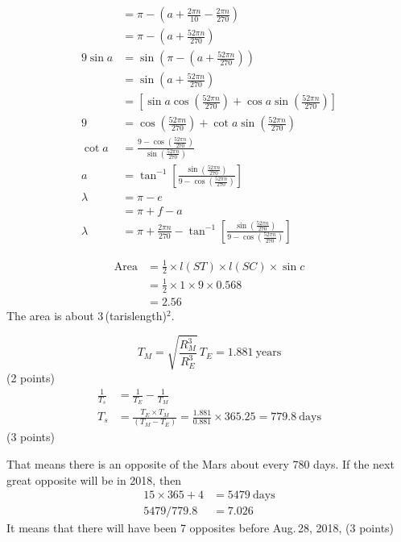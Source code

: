 \begin{description}
\begin{align*}
    &= \pi - \left(a + \frac{2\pi n}{10} - \frac{2\pi n}{270}\right) \tag{19}\\
    &= \pi - \left(a + \frac{52\pi n}{270}\right) \tag{20}\\[6pt]
  9\sin a &= \sin\left(\pi - \left(a + \frac{52\pi n}{270}\right)\right)
    \tag{21}\\
    &= \sin\left(a + \frac{52\pi n}{270}\right) \tag{22}\\
    &= \left[\sin a\cos\left(\frac{52\pi n}{270}\right)
       + \cos a\sin\left(\frac{52\pi n}{270}\right)\right] \tag{23}\\
  9 &= \cos\left(\frac{52\pi n}{270}\right)
       + \cot a\sin\left(\frac{52\pi n}{270}\right) \tag{24}\\
  \cot a &= \frac{9 - \cos\left(\frac{52\pi n}{270}\right)}
                 {\sin\left(\frac{52\pi n}{270}\right)} \tag{25}\\
  a &= \tan^{-1}\!\left[\frac{\sin\left(\frac{52\pi n}{270}\right)}
       {9 - \cos\left(\frac{52\pi n}{270}\right)}\right] \tag{26}\\[6pt]
  \lambda &= \pi - e \tag{27}\\
          &= \pi + f - a \tag{28}\\
  \lambda &= \pi + \frac{2\pi n}{270}
     - \tan^{-1}\!\left[\frac{\sin\left(\frac{52\pi n}{270}\right)}
       {9 - \cos\left(\frac{52\pi n}{270}\right)}\right] \tag{29}
  \end{align*}
\item[(g)]
  \begin{align*}
  \text{Area} &= \frac12 \times l(ST) \times l(SC) \times \sin c\\
              &= \frac12 \times 1 \times 9 \times 0.568\\
              &= 2.56
  \end{align*}
  The area is about 3\,(tarislength)$^2$.
\end{description}

\[
T_M = \sqrt{\frac{R_M^3}{R_E^3}}\,T_E = 1.881\ \mathrm{years}
\]
\hfill(2 points)
\begin{align*}
\frac{1}{T_s} &= \frac{1}{T_E} - \frac{1}{T_M}\\
T_s &= \frac{T_E \times T_M}{(T_M - T_E)}
     = \frac{1.881}{0.881}\times 365.25 = 779.8\ \mathrm{days}
\end{align*}
\hfill(3 points)

That means there is an opposite of the Mars about every 780 days. If the next
great opposite will be in 2018, then
\begin{align*}
15\times 365 + 4 &= 5479\ \mathrm{days}\\
5479/779.8 &= 7.026
\end{align*}
It means that there will have been 7 opposites before Aug.\,28, 2018,
\hfill(3 points)

